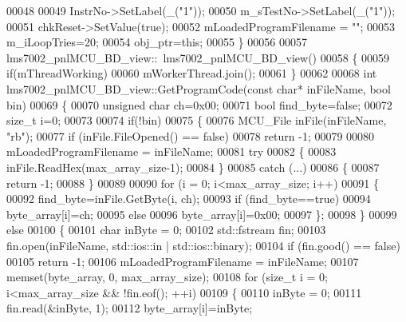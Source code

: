 \begin{DoxyCode}
{00048 
00049     InstrNo->SetLabel(\_(\textcolor{stringliteral}{"1"}));
00050     m_sTestNo->SetLabel(\_(\textcolor{stringliteral}{"1"}));
00051     chkReset->SetValue(\textcolor{keyword}{true});
00052     mLoadedProgramFilename = \textcolor{stringliteral}{""};
00053     m_iLoopTries=20;
00054     obj_ptr=\textcolor{keyword}{this};
00055 \}
00056 
00057 lms7002_pnlMCU_BD_view::~lms7002_pnlMCU_BD_view()
00058 \{
00059     \textcolor{keywordflow}{if}(mThreadWorking)
00060         mWorkerThread.join();
00061 \}
00062 
00068 \textcolor{keywordtype}{int} lms7002_pnlMCU_BD_view::GetProgramCode(\textcolor{keyword}{const} \textcolor{keywordtype}{char}* inFileName, \textcolor{keywordtype}{bool} bin)
00069 \{
00070     \textcolor{keywordtype}{unsigned} \textcolor{keywordtype}{char} ch=0x00;
00071     \textcolor{keywordtype}{bool} find\_byte=\textcolor{keyword}{false};
00072     \textcolor{keywordtype}{size\_t} i=0;
00073 
00074     \textcolor{keywordflow}{if}(!bin)
00075     \{
00076         MCU_File    inFile(inFileName, \textcolor{stringliteral}{"rb"});
00077         \textcolor{keywordflow}{if} (inFile.FileOpened() == \textcolor{keyword}{false})
00078             \textcolor{keywordflow}{return} -1;
00079 
00080         mLoadedProgramFilename = inFileName;
00081         \textcolor{keywordflow}{try}
00082         \{
00083             inFile.ReadHex(max_array_size-1);
00084         \}
00085         \textcolor{keywordflow}{catch} (...)
00086         \{
00087             \textcolor{keywordflow}{return} -1;
00088         \}
00089 
00090         \textcolor{keywordflow}{for} (i = 0; i<max_array_size; i++)
00091         \{
00092             find\_byte=inFile.GetByte(i, ch);
00093             \textcolor{keywordflow}{if} (find\_byte==\textcolor{keyword}{true})
00094                 byte_array[i]=ch;
00095             \textcolor{keywordflow}{else}
00096                 byte_array[i]=0x00;
00097         \};
00098     \}
00099     \textcolor{keywordflow}{else}
00100     \{
00101         \textcolor{keywordtype}{char} inByte = 0;
00102         std::fstream fin;
00103         fin.open(inFileName, std::ios::in | std::ios::binary);
00104         \textcolor{keywordflow}{if} (fin.good() == \textcolor{keyword}{false})
00105             \textcolor{keywordflow}{return} -1;
00106         mLoadedProgramFilename = inFileName;
00107         memset(byte_array, 0, max_array_size);
00108         \textcolor{keywordflow}{for} (\textcolor{keywordtype}{size\_t} i = 0; i<max_array_size && !fin.eof(); ++i)
00109         \{
00110             inByte = 0;
00111             fin.read(&inByte, 1);
00112             byte_array[i]=inByte;
}
\end{DoxyCode}

